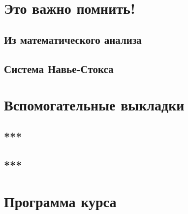 
\LARGE



\section*{Это важно помнить!}

\subsection*{Из математического анализа}


\subsection*{Система Навье-Стокса}


\newpage


\newpage
\section*{Вспомогательные выкладки}
\subsection*{***}

\subsection*{***}


\newpage
\section*{Программа курса}





